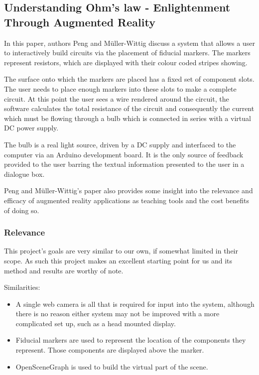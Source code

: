 \subsection{Understanding Ohm's law - Enlightenment Through Augmented Reality}
In this paper\cite{peng2010understanding}, authors Peng and M\"{u}ller-Wittig discuss a system that allows a user to interactively build circuits via the placement of fiducial markers. The markers represent resistors, which are displayed with their colour coded stripes showing.

The surface onto which the markers are placed has a fixed set of component slots. The user needs to place enough markers into these slots to make a complete circuit. At this point the user sees a wire rendered around the circuit, the software calculates the total resistance of the circuit and consequently the current which must be flowing through a bulb which is connected in series with a virtual DC power supply.

The bulb is a real light source, driven by a DC supply and interfaced to the computer via an Arduino development board. It is the only source of feedback provided to the user barring the textual information presented to the user in a dialogue box.

Peng and M\"{u}ller-Wittig's paper also provides some insight into the relevance and efficacy of augmented reality applications as teaching tools and the cost benefits of doing so.

\subsubsection{Relevance}
This project's goals are very similar to our own, if somewhat limited in their scope. As such this project makes an excellent starting point for us and its method and results are worthy of note.

Similarities:
\begin{itemize}
\item A single web camera is all that is required for input into the system, although there is no reason either system may not be improved with a more complicated set up, such as a head mounted display.
\item Fiducial markers are used to represent the location of the components they represent. Those components are displayed above the marker.
\item OpenSceneGraph is used to build the virtual part of the scene.
\end{itemize}

